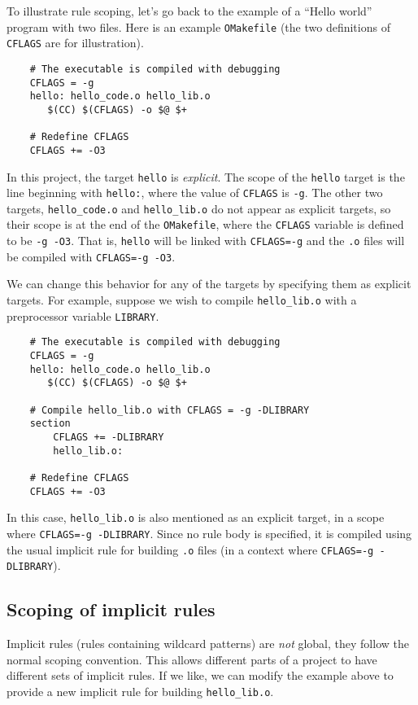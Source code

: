 To illustrate rule scoping, let's go back to the example of a ``Hello world'' program with two
files.  Here is an example \verb+OMakefile+ (the two definitions of \verb+CFLAGS+ are for
illustration).

\begin{verbatim}
    # The executable is compiled with debugging
    CFLAGS = -g
    hello: hello_code.o hello_lib.o
       $(CC) $(CFLAGS) -o $@ $+

    # Redefine CFLAGS
    CFLAGS += -O3
\end{verbatim}

In this project, the target \verb+hello+ is \emph{explicit}.  The scope of the \verb+hello+ target
is the line beginning with \verb+hello:+, where the value of \verb+CFLAGS+ is \verb+-g+.  The other
two targets, \verb+hello_code.o+ and \verb+hello_lib.o+ do not appear as explicit targets, so their
scope is at the end of the \verb+OMakefile+, where the \verb+CFLAGS+ variable is defined to be
\verb+-g -O3+.  That is, \verb+hello+ will be linked with \verb+CFLAGS=-g+ and the \verb+.o+ files
will be compiled with \verb+CFLAGS=-g -O3+.

We can change this behavior for any of the targets by specifying them as explicit targets.  For
example, suppose we wish to compile \verb+hello_lib.o+ with a preprocessor variable \verb+LIBRARY+.

\begin{verbatim}
    # The executable is compiled with debugging
    CFLAGS = -g
    hello: hello_code.o hello_lib.o
       $(CC) $(CFLAGS) -o $@ $+

    # Compile hello_lib.o with CFLAGS = -g -DLIBRARY
    section
        CFLAGS += -DLIBRARY
        hello_lib.o:

    # Redefine CFLAGS
    CFLAGS += -O3
\end{verbatim}

In this case, \verb+hello_lib.o+ is also mentioned as an explicit target, in a scope where
\verb+CFLAGS=-g -DLIBRARY+.  Since no rule body is specified, it is compiled using the usual
implicit rule for building \verb+.o+ files (in a context where \verb+CFLAGS=-g -DLIBRARY+).

\subsection{Scoping of implicit rules}

Implicit rules (rules containing wildcard patterns) are \emph{not} global, they follow the normal
scoping convention.  This allows different parts of a project to have different sets of implicit
rules.  If we like, we can modify the example above to provide a new implicit rule for building
\verb+hello_lib.o+.

